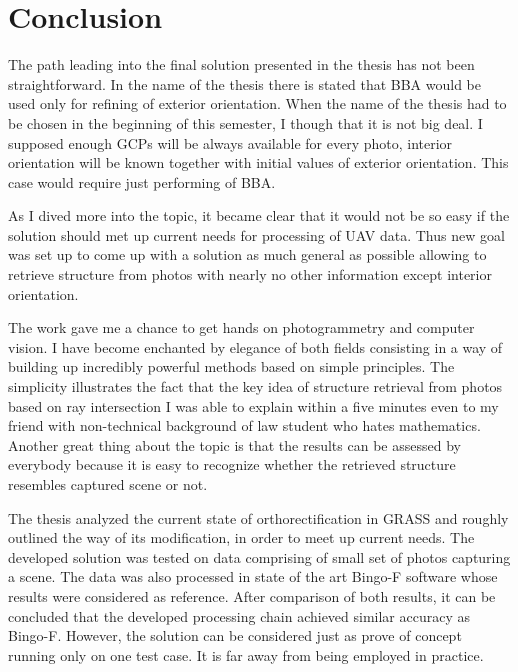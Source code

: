 \documentclass[a4paper,12pt]{article}
\begin{document}
\newpage
\section{Conclusion}

The path leading into the final solution presented in the thesis has not been straightforward.
In the name of the thesis there is stated that BBA would be 
used only for refining of exterior orientation. When the name of the thesis had to be chosen in the beginning of this semester, I though that 
it is not big deal. 
I supposed enough GCPs will be 
always available for every photo, interior orientation will be 
known together with initial values of exterior orientation.
This case would require just
performing of BBA.

As I dived more into the topic, it became clear that it would not be so easy 
 if the solution should met up current needs for processing of UAV data.
Thus new goal was set up to come up with a solution as much general 
 as possible allowing to retrieve structure from photos with nearly no other information except interior orientation.
 
The work gave me a chance to get hands on photogrammetry and computer vision. I have become enchanted
by elegance of both fields consisting in a way of building up incredibly powerful methods based on simple principles.  
The simplicity illustrates the fact that the key idea of structure retrieval from photos based on ray intersection
I was able to explain within a five minutes even to my friend with non-technical background of law student who 
  hates mathematics.
Another great thing about the topic is that the results can be assessed
by everybody because it is easy to recognize whether the retrieved structure resembles captured scene or not. 

 The thesis analyzed the current state of orthorectification in GRASS and roughly outlined the way of its modification,
 in order to meet up current needs. 
  The developed solution was tested on data comprising of small set of photos capturing a scene.
  The data was also processed in state of the art Bingo-F software whose results were considered as reference.
  After comparison of both results, it can be concluded that the developed processing 
  chain achieved similar accuracy as Bingo-F. However, the solution can be considered just as prove of concept 
  running only on one test case. It is far away from being employed in practice. 

\end{document}

